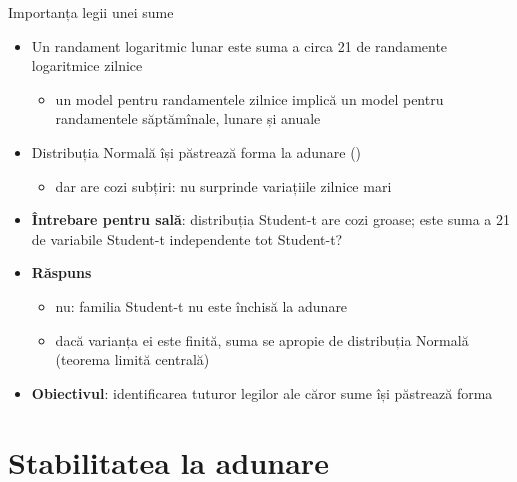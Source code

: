 \begin{frame}{Importanța legii unei sume}
\itemsize{\small}
\begin{itemize}
    \item Un randament logaritmic lunar este suma a circa 21 de randamente logaritmice zilnice
    \begin{itemize}
        \item un model pentru randamentele zilnice implică un model pentru randamentele săptămînale, lunare și anuale
    \end{itemize}
    \item Distribuția Normală își păstrează forma la adunare ()
    \begin{itemize}
        \item dar are cozi subțiri: nu surprinde variațiile zilnice mari
    \end{itemize}
    \item \textbf{Întrebare pentru sală}: distribuția Student-t are cozi groase; este suma a 21 de variabile Student-t independente tot Student-t?
    \item \textbf{Răspuns}
    \begin{itemize}
        \item nu: familia Student-t nu este închisă la adunare
        \item dacă varianța ei este finită, suma se apropie de distribuția Normală (teorema limită centrală)
    \end{itemize}
    \item \textbf{Obiectivul}: identificarea tuturor legilor ale căror sume își păstrează forma
\end{itemize}
\end{frame}


\section{Stabilitatea la adunare}

